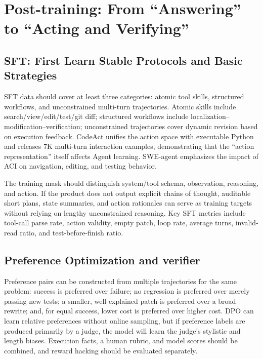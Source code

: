 \documentclass[10pt,a4paper,UTF8,fontset=none]{ctexart}
\begin{document}
\section{Post-training: From ``Answering'' to ``Acting and Verifying''}

\subsection{SFT: First Learn Stable Protocols and Basic Strategies}

SFT data should cover at least three categories: atomic tool skills, structured workflows, and unconstrained multi-turn trajectories. Atomic skills include search/view/edit/test/git diff; structured workflows include localization--modification--verification; unconstrained trajectories cover dynamic revision based on execution feedback. CodeAct unifies the action space with executable Python and releases 7K multi-turn interaction examples, demonstrating that the ``action representation'' itself affects Agent learning\cite{wang2024codeact}. SWE-agent emphasizes the impact of ACI on navigation, editing, and testing behavior\cite{yang2024sweagent}.

The training mask should distinguish system/tool schema, observation, reasoning, and action. If the product does not output explicit chains of thought, auditable short plans, state summaries, and action rationales can serve as training targets without relying on lengthy unconstrained reasoning. Key SFT metrics include tool-call parse rate, action validity, empty patch, loop rate, average turns, invalid-read ratio, and test-before-finish ratio.

\subsection{Preference Optimization and verifier}

Preference pairs can be constructed from multiple trajectories for the same problem: success is preferred over failure; no regression is preferred over merely passing new tests; a smaller, well-explained patch is preferred over a broad rewrite; and, for equal success, lower cost is preferred over higher cost. DPO can learn relative preferences without online sampling, but if preference labels are produced primarily by a judge, the model will learn the judge's stylistic and length biases. Execution facts, a human rubric, and model scores should be combined, and reward hacking should be evaluated separately.
\end{document}
